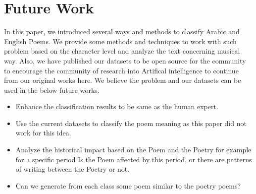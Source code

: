\section*{Future Work}
In this paper, we introduced several ways and methods  to classify Arabic and English Poems. We provide some methods and techniques to work with such problem based on the character level and analyze the text concerning musical way. Also, we have published our datasets to be open source for the community to encourage the community of research into Artifical intelligence to continue from our original works here. We believe the problem and our datasets can be used in the below future works.

\begin{itemize}
\item Enhance the classification results to be same as the human expert.
\item Use the current datasets to classify the poem meaning as this paper did not work for this idea. %
\item Analyze the historical impact based on the Poem and the Poetry for example for a specific period Is the Poem affected by this period, or there are patterns of writing between the Poetry or not.
\item Can we generate from each class some poem similar to the poetry poems?
\end{itemize}
